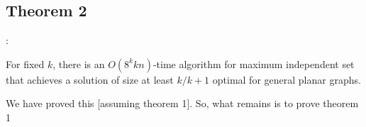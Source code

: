 \documentclass{beamer}
\begin{document}
\subsection{Theorem 2}
\begin{frame}{\secname : \subsecname}
    \begin{theorem}
        [Baker, 1994] For fixed $k$, there is an
$O(8^kkn)$-time algorithm for maximum independent set
that achieves a solution of size at least $k/k+1$ optimal for
general planar graphs. 
    \end{theorem}

    We have proved this [assuming theorem 1]. So, what remains is to prove theorem 1
\end{frame}
\end{document}
